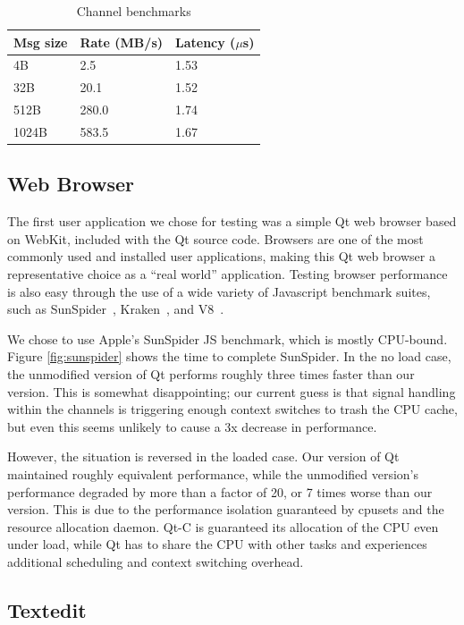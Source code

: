 \documentclass[letterpaper,twocolumn,11pt]{article}
\begin{document}
\begin{table}[tp]
\centering
\begin{tabular}{| l | l | l |}
\hline
Msg size	&Rate (MB/s)		& Latency ($\mu$s) \\ \hline
4B		&2.5	& 1.53 \\
32B		&20.1	& 1.52 \\
512B	&280.0	& 1.74 \\
1024B	&583.5	& 1.67 \\
\hline
\end{tabular}
\caption{Channel benchmarks}
\label{tab:channel}
\end{table}

\subsection{Web Browser}

The first user application we chose for testing was a simple Qt web browser based on WebKit, included with the Qt source code. Browsers are one of the most commonly used and installed user applications, making this Qt web browser a representative choice as a ``real world'' application. Testing browser performance is also easy through the use of a wide variety of Javascript benchmark suites, such as SunSpider~\cite{sunspider}, Kraken~\cite{kraken}, and V8~\cite{v8benchmark}.

We chose to use Apple's SunSpider JS benchmark, which is mostly CPU-bound. Figure \ref{fig:sunspider} shows the time to complete SunSpider. In the no load case, the unmodified version of Qt performs roughly three times faster than our version. This is somewhat disappointing; our current guess is that signal handling within the channels is triggering enough context switches to trash the CPU cache, but even this seems unlikely to cause a 3x decrease in performance.

However, the situation is reversed in the loaded case. Our version of Qt maintained roughly equivalent performance, while the unmodified version's performance degraded by more than a factor of 20, or 7 times worse than our version. This is due to the performance isolation guaranteed by cpusets and the resource allocation daemon. Qt-C is guaranteed its allocation of the CPU even under load, while Qt has to share the CPU with other tasks and experiences additional scheduling and context switching overhead.

\subsection{Textedit}
\end{document}
